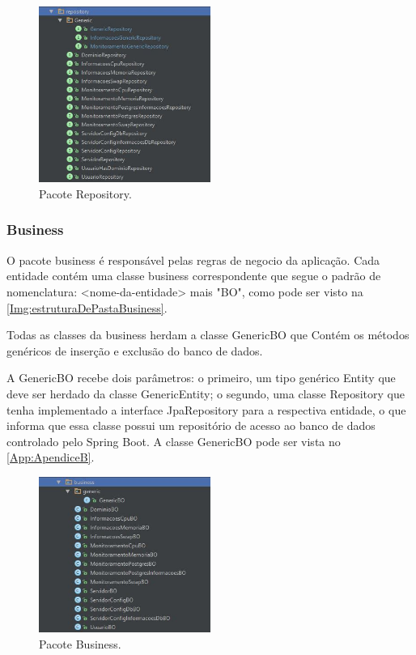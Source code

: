 \begin{figure}[H]
	\centering
	\includegraphics[width=0.5\textwidth]{figuras/estruturaPojetoRepository.JPG}
	\caption[Pacote Repository.]{Pacote Repository.}
	\label{Img:estruturaDePastaRepository}
\end{figure}


\subsubsection{Business}\label{subsubsec:business}

O pacote business é responsável pelas regras de negocio da aplicação. Cada entidade contém uma classe business correspondente que segue o padrão de nomenclatura: <nome-da-entidade> mais "BO", como pode ser visto na \autoref{Img:estruturaDePastaBusiness}. 

Todas as classes da business herdam a classe GenericBO que Contém os métodos genéricos de inserção e exclusão do banco de dados. 

A GenericBO recebe dois parâmetros: o primeiro, um tipo genérico Entity que deve ser herdado da classe GenericEntity; o segundo, uma classe Repository que tenha implementado a interface JpaRepository para a respectiva entidade, o que informa que essa classe possui um repositório de acesso ao banco de dados controlado pelo Spring Boot. A classe GenericBO pode ser vista no \autoref{App:ApendiceB}.

\begin{figure}[H]
	\centering
	\includegraphics[width=0.5\textwidth]{figuras/estruturaPojetoBusines.JPG}
	\caption[Pacote Business.]{Pacote Business.}
	\label{Img:estruturaDePastaBusiness}
\end{figure}



